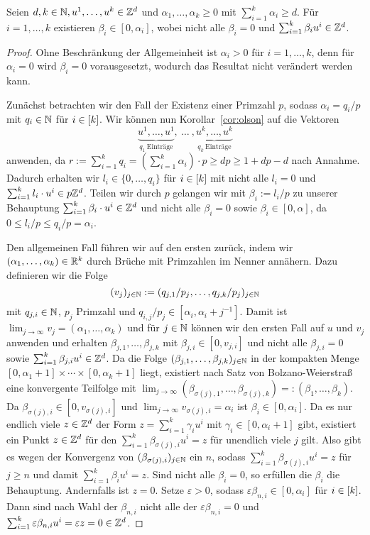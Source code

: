 \begin{lemma}
	Seien $d,k\in\mathbb{N}, u^1,\dots, u^k\in\mathbb{Z}^d$ und $\alpha_1,\dots,\alpha_k\geq0$ mit $\sum_{i=1}^k \alpha_i\geq d$.
	Für $i=1,\dots,k$ existieren $\beta_i\in[0,\alpha_i]$, wobei nicht alle $\beta_i=0$ und $\sum_{i=1}^k\beta_i u^i \in\mathbb{Z}^d$.
\end{lemma}
\begin{proof}
	\newcommand{\bbeta}{\tilde{\beta}}
	Ohne Beschränkung der Allgemeinheit ist $\alpha_i>0$ für $i=1,\dots,k$, denn für $\alpha_i=0$ wird $\beta_i=0$ vorausgesetzt, wodurch das Resultat nicht verändert werden kann.
	
	Zunächst betrachten wir den Fall der Existenz einer Primzahl $p$, sodass   $\alpha_i=q_i / p$ mit $q_i\in\mathbb{N}$ für $i\in[k]$.
	Wir können nun Korollar~\ref{cor:olson} auf die Vektoren
	$$\underbrace{u^1,\dots,u^1}_{q_1~\text{Einträge}},~\dots~,\underbrace{u^k,\dots,u^k}_{q_k~\text{Einträge}}$$
	anwenden, da $r:=\sum_{i=1}^k q_i=(\sum_{i=1}^k \alpha_i)\cdot p\geq dp \geq 1+dp-d$ nach Annahme.
	Dadurch erhalten wir $l_i\in\{0,\dots,q_i\}$ für $i\in[k]$ mit nicht alle $l_i=0$ und $\sum_{i=1}^k l_i\cdot u^i\in p\mathbb{Z}^d$.
	Teilen wir durch $p$ gelangen wir mit $\beta_i := l_i/p$ zu unserer Behauptung $\sum_{i=1}^k \beta_i\cdot u^i\in\mathbb{Z}^d$ und nicht alle $\beta_i=0$ sowie $\beta_i\in[0,\alpha]$, da $0\leq l_i/p\leq q_i/p=\alpha_i$.
	
	Den allgemeinen Fall führen wir auf den ersten zurück, indem wir $(\alpha_1,\dots,\alpha_k)\in\mathbb{R}^k$ durch Brüche mit Primzahlen im Nenner annähern.
	Dazu definieren wir die Folge 
	$$
	(v_j)_{j\in\mathbb{N}}:=(q_{j,1}/p_j,\dots,q_{j,k}/p_j)_{j\in\mathbb{N}}$$
	mit $q_{j,i}\in\mathbb{N}$, $p_j$ Primzahl und $q_{i,j}/p_j\in[\alpha_i, \alpha_i+j^{-1}]$.
	Damit ist $\lim_{j\rightarrow\infty}v_j=(\alpha_1,\dots,\alpha_k)$ und für $j\in\mathbb{N}$ können wir den ersten Fall auf $u$ und $v_j$ anwenden und erhalten $\beta_{j,1},\dots,\beta_{j,k}$ mit $\beta_{j,i}\in[0,v_{j,i}]$ und nicht alle $\beta_{j,i}=0$ sowie $\sum_{i=1}^k\beta_{j,i}u^i \in\mathbb{Z}^d$.
	Da die Folge $(\beta_{j,1},\dots,\beta_{j,k})_{j\in\mathbb{N}}$ in der kompakten Menge $[0,\alpha_1+1]\times\cdots\times[0,\alpha_k+1]$ liegt, existiert nach Satz von Bolzano-Weierstraß eine konvergente Teilfolge mit $\lim_{j\rightarrow\infty}(\beta_{\sigma(j),1},\dots,\beta_{\sigma(j),k})=:(\beta_1,\dots,\beta_k)$.
	Da $\beta_{\sigma(j),i}\in[0,v_{\sigma(j),i}]$ und $\lim_{j\rightarrow\infty}v_{\sigma(j),i}=\alpha_i$ ist $\beta_i\in[0,\alpha_i]$.
	Da es nur endlich viele $z\in\mathbb{Z}^d$ der Form $z=\sum_{i=1}^k\gamma_i u^i$ mit $\gamma_i\in[0,\alpha_i+1]$ gibt, existiert ein Punkt $z\in\mathbb{Z}^d$ für den $\sum_{i=1}^k \beta_{\sigma(j),i} u^i=z$ für unendlich viele $j$ gilt.
	Also gibt es wegen der Konvergenz von $(\beta_{\sigma(j),i})_{j\in\mathbb{N}}$ ein $n$, sodass $\sum_{i=1}^k\beta_{\sigma(j),i}u^i=z$ für $j\geq n$ und damit $\sum_{i=1}^k\beta_i u^i=z$.
	Sind nicht alle $\beta_i=0$, so erfüllen die $\beta_i$ die Behauptung.
	Andernfalls ist $z=0$. Setze $\varepsilon>0$, sodass $\varepsilon\beta_{n,i}\in[0,\alpha_i]$ für $i\in[k]$.
	Dann sind nach Wahl der $\beta_{n,i}$ nicht alle der $\varepsilon\beta_{n,i}=0$ und $\sum_{i=1}^k\varepsilon\beta_{n,i}u^i=\varepsilon z=0\in\mathbb{Z}^d$.
\end{proof}

